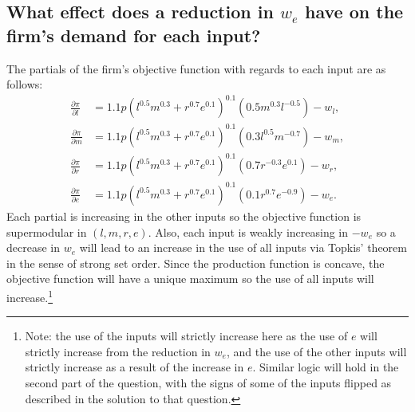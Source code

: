 \documentclass[11pt]{article} %
\begin{document}
\subsection{What effect does a reduction in $w_e$ have on the firm's demand for each input?}
The partials of the firm's objective function with regards to each input are as follows:
\begin{align*}
\frac{\partial \pi}{\partial l} &= 1.1p(l^{0.5}m^{0.3} + r^{0.7}e^{0.1})^{0.1}(0.5m^{0.3}l^{-0.5}) - w_l, \\
\frac{\partial \pi}{\partial m} &= 1.1p(l^{0.5}m^{0.3} + r^{0.7}e^{0.1})^{0.1}(0.3l^{0.5}m^{-0.7}) - w_m, \\
\frac{\partial \pi}{\partial r} &= 1.1p(l^{0.5}m^{0.3} + r^{0.7}e^{0.1})^{0.1}(0.7r^{-0.3}e^{0.1}) - w_r, \\
\frac{\partial \pi}{\partial e} &= 1.1p(l^{0.5}m^{0.3} + r^{0.7}e^{0.1})^{0.1}(0.1r^{0.7}e^{-0.9}) - w_e. 
\end{align*}
Each partial is increasing in the other inputs so the objective function is supermodular in $(l,m,r,e)$. Also, each input is weakly increasing in $-w_e$ so a decrease in $w_e$ will lead to an increase in the use of all inputs via Topkis' theorem in the sense of strong set order. Since the production function is concave, the objective function will have a unique maximum so the use of all inputs will increase.\footnote{Note: the use of the inputs will strictly increase here as the use of $e$ will strictly increase from the reduction in $w_e$, and the use of the other inputs will strictly increase as a result of the increase in $e$. Similar logic will hold in the second part of the question, with the signs of some of the inputs flipped as described in the solution to that question.}
\end{document}
